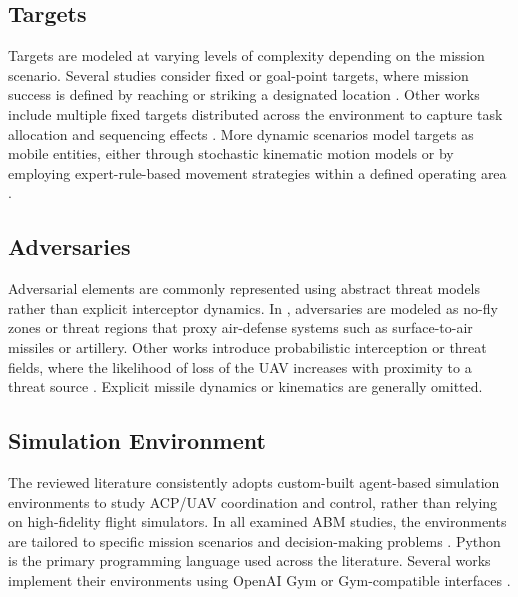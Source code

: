 \subsection{Targets}

Targets are modeled at varying levels of complexity depending on the mission scenario. Several studies consider fixed or goal-point targets, where mission success is defined by reaching or striking a designated location \cite{yuksek2021cooperative,xu2025mdrl_uav_combat}. Other works include multiple fixed targets distributed across the environment to capture task allocation and sequencing effects \cite{Fang2021CollaborativeCombat}. More dynamic scenarios model targets as mobile entities, either through stochastic kinematic motion models or by employing expert-rule-based movement strategies within a defined operating area \cite{Jiang2025DDPGSwarmTaskPlanning,Wang2025CooperativeUAV}.


\subsection{Adversaries}

Adversarial elements are commonly represented using abstract threat models rather than explicit interceptor dynamics. In \cite{yuksek2021cooperative}, adversaries are modeled as no-fly zones or threat regions that proxy air-defense systems such as surface-to-air missiles or artillery. Other works introduce probabilistic interception or threat fields, where the likelihood of loss of the UAV increases with proximity to a threat source \cite{Wang2025CooperativeUAV,Fang2021CollaborativeCombat}. Explicit missile dynamics or kinematics are generally omitted.

\subsection{Simulation Environment}
The reviewed literature consistently adopts custom-built agent-based simulation environments to study ACP/UAV coordination and control, rather than relying on high-fidelity flight simulators. In all examined ABM studies, the environments are tailored to specific mission scenarios and decision-making problems \cite{yue2022uav_sead_hmarl,Fang2021CollaborativeCombat,Lee2023MUMTSEAD,xu2025mdrl_uav_combat,Wang2025CooperativeUAV,yuksek2021cooperative}. Python is the primary programming language used across the literature. Several works implement their environments using OpenAI Gym or Gym-compatible interfaces \cite{Lee2023MUMTSEAD,xu2025mdrl_uav_combat}.



